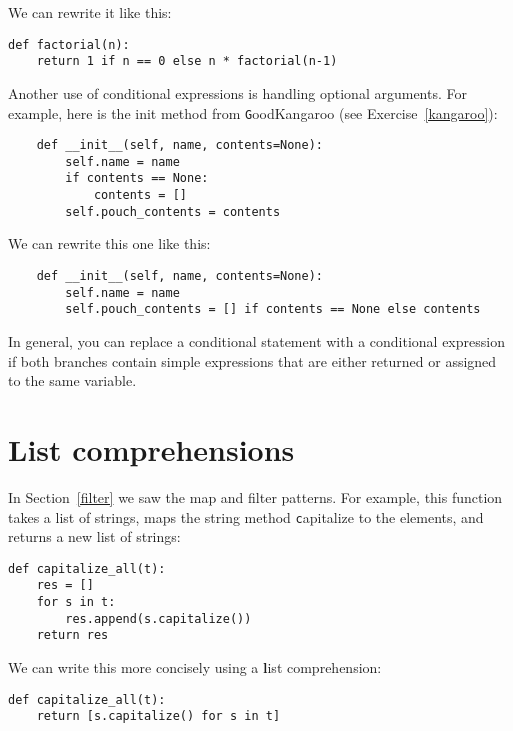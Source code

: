 \documentclass[
DIV=11,
fontsize=13,
twoside,
headinclude=false,
titlepage=firstiscover,
abstract=true,
headsepline=true,
footsepline=true,
chapterprefix=true, %
headings=big,
bibliography=totoc,%
captions=tableheading
]{scrbook}
\theoremstyle{definition}
\begin{document}
We can rewrite it like this:

\begin{lstlisting}
def factorial(n):
    return 1 if n == 0 else n * factorial(n-1)
\end{lstlisting}

Another use of conditional expressions is handling optional
arguments.  For example, here is the init method from
{\texttt GoodKangaroo} (see Exercise~\ref{kangaroo}):

\begin{lstlisting}
    def __init__(self, name, contents=None):
        self.name = name
        if contents == None:
            contents = []
        self.pouch_contents = contents
\end{lstlisting}

We can rewrite this one like this:

\begin{lstlisting}
    def __init__(self, name, contents=None):
        self.name = name
        self.pouch_contents = [] if contents == None else contents 
\end{lstlisting}

In general, you can replace a conditional statement with a conditional
expression if both branches contain simple expressions that are
either returned or assigned to the same variable.



\section{List comprehensions}

In Section~\ref{filter} we saw the map and filter patterns.  For
example, this function takes a list of strings, maps the string method
{\texttt capitalize} to the elements, and returns a new list of strings:

\begin{lstlisting}
def capitalize_all(t):
    res = []
    for s in t:
        res.append(s.capitalize())
    return res
\end{lstlisting}

We can write this more concisely using a {\textbf list comprehension}:

\begin{lstlisting}
def capitalize_all(t):
    return [s.capitalize() for s in t]
\end{lstlisting}
\end{document}
